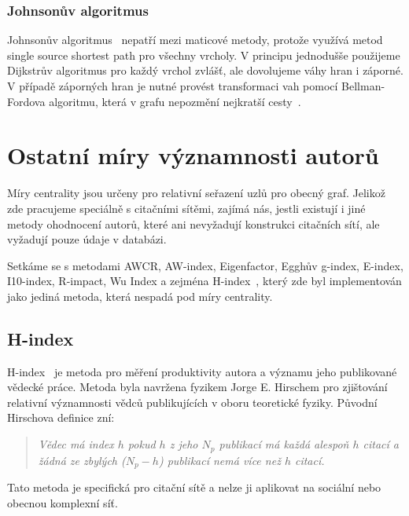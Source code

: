 \documentclass{bakalarka}
\begin{document}
\subsubsection{Johnsonův algoritmus}
Johnsonův algoritmus~\citep{johnson1977} nepatří mezi maticové metody, protože
využívá metod single source shortest path pro všechny vrcholy. V principu
jednodušše použijeme Dijkstrův algoritmus pro každý vrchol zvlášť, ale
dovolujeme váhy hran i záporné. V případě záporných hran je nutné provést
transformaci vah pomocí Bellman-Fordova algoritmu, která v grafu nepozmění
nejkratší cesty~\citep{CLRS}.


\section{Ostatní míry významnosti autorů}
Míry centrality jsou určeny pro relativní seřazení uzlů pro obecný graf.
Jelikož zde pracujeme speciálně s citačními sítěmi, zajímá nás, jestli existují
i jiné metody ohodnocení autorů, které ani nevyžadují konstrukci citačních
sítí, ale vyžadují pouze údaje v databázi.

Setkáme se s metodami AWCR, AW-index, Eigenfactor, Egghův g-index, E-index,
I10-index, R-impact, Wu Index a zejména H-index~\citep{hlwikiaim}, který zde
byl implementován jako jediná metoda, která nespadá pod míry centrality.

\subsection{H-index}
H-index~\citep{hirsch2005} je metoda pro měření produktivity autora a významu jeho publikované
vědecké práce. Metoda byla navržena fyzikem Jorge E. Hirschem pro zjištování
relativní významnosti vědců publikujících v oboru teoretické fyziky. Původní
Hirschova definice zní:

\begin{quote}\textit{
Vědec má index $h$ pokud $h$ z jeho $N_p$ publikací má každá alespoň $h$ citací
a žádná ze zbylých ($N_p - h$) publikací nemá více než $h$ citací.
}
\end{quote}

Tato metoda je specifická pro citační sítě a nelze ji aplikovat na sociální
nebo obecnou komplexní síť.
\end{document}
